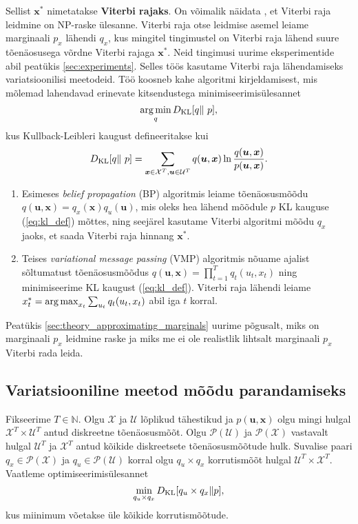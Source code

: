 Sellist $\mathbf{x}^*$ nimetatakse \textbf{Viterbi rajaks}. On võimalik näidata \parencite{LYNGSO2002545}, et Viterbi raja leidmine on NP-raske ülesanne. Viterbi raja otse leidmise asemel leiame marginaali $p_x$ lähendi $q_x$, kus mingitel tingimustel on Viterbi raja lähend suure tõenäosusega võrdne Viterbi rajaga $\bm{x}^*$. Neid tingimusi uurime eksperimentide abil peatükis \ref{sec:experiments}. Selles töös kasutame Viterbi raja lähendamiseks variatsioonilisi meetodeid. Töö koosneb kahe algoritmi kirjeldamisest, mis mõlemad lahendavad erinevate kitsendustega minimiseerimisülesannet
\begin{equation}
    \label{eq:problem_def2}
    \operatorname*{arg\,min}_{q} D_{\mathrm{KL}}[q \|\ p],
\end{equation}
kus Kullback-Leibleri kaugust defineeritakse kui
\begin{equation}
    \label{eq:kl_def}
    D_{\mathrm{KL}}[q \|\ p] = \sum_{\bm{x} \in \mathcal{X}^T, \bm{u} \in \mathcal{U}^T} q(\bm{u}, \bm{x}) \ln \frac{q(\bm{u}, \bm{x})}{p(\bm{u}, \bm{x})}.
\end{equation}

\begin{enumerate}
    \item Esimeses \emph{belief propagation} (BP) algoritmis leiame tõenäosusmõõdu $q(\bm{u}, \bm{x}) = q_x(\bm{x})q_u(\bm{u})$, mis oleks hea lähend mõõdule $p$ KL kauguse (\ref{eq:kl_def}) mõttes, ning seejärel kasutame Viterbi algoritmi mõõdu $q_x$ jaoks, et saada Viterbi raja hinnang $\bm{x}^*$.
    \item Teises \emph{variational message passing} (VMP) algoritmis nõuame ajalist sõltumatust tõenäosusmõõdus $q(\bm{u}, \bm{x}) = \prod_{t=1}^T q_t(u_t,x_t)$ ning minimiseerime KL kaugust (\ref{eq:kl_def}). Viterbi raja lähendi leiame $x_t^* = \operatorname*{arg\,max}_{x_t} \sum_{u_t} q_t(u_t,x_t)$ abil iga $t$ korral.
\end{enumerate}

Peatükis \ref{sec:theory_approximating_marginals} uurime põgusalt, miks on marginaali $p_x$ leidmine raske ja miks me ei ole realistlik lihtsalt marginaali $p_x$ Viterbi rada leida. 

\subsection{Variatsiooniline meetod mõõdu parandamiseks}\label{sec:theory_variational_method}

Fikseerime $T \in \mathbb{N}$. Olgu $\mathcal{X}$ ja $\mathcal{U}$ lõplikud tähestikud ja $p(\bm{u},\bm{x})$ olgu mingi hulgal $\mathcal{X}^T \times \mathcal{U}^T$ antud diskreetne tõenäosusmõõt. Olgu $\mathcal{P}(\mathcal{U})$ ja $\mathcal{P}(\mathcal{X})$ vastavalt hulgal $\mathcal{U}^T$ ja $\mathcal{X}^T$ antud kõikide diskreetsete tõenäosusmõõtude hulk. Suvalise paari $q_x \in \mathcal{P}(\mathcal{X})$ ja $q_u \in \mathcal{P}(\mathcal{U})$ korral olgu $q_u \times q_x$ korrutismõõt hulgal $\mathcal{U}^T \times \mathcal{X}^T$. Vaatleme optimiseerimisülesannet
\begin{equation}
    \label{eq:problem}
    \min_{q_u \times q_x} D_{\mathrm{KL}}[q_u \times q_x \| p],
\end{equation}
kus miinimum võetakse üle kõikide korrutismõõtude.

